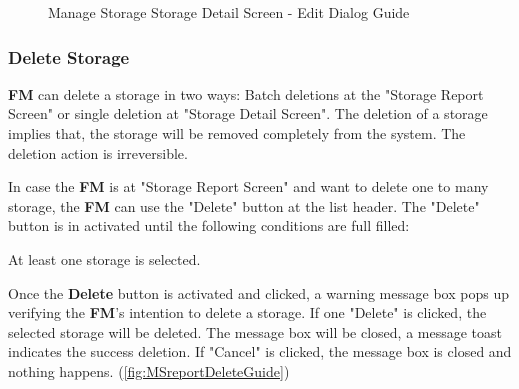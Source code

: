 \begin{figure}[H]
	\centering
    \vspace{5pt}
    \hspace{5pt}
    \caption{Manage Storage Storage Detail Screen - Edit Dialog Guide}
	\label{fig:MSDetailEditBtn}
\end{figure}

\subsubsection{Delete Storage}

\textbf{FM} can delete a storage in two ways: Batch deletions at the "Storage Report Screen" or single deletion at "Storage Detail Screen". 
The deletion of a storage implies that, the storage will be removed completely from the system. The deletion action is irreversible. 

In case the \textbf{FM} is at "Storage Report Screen" and want to delete one to many storage, the \textbf{FM} can use the "Delete" button at the list header. The "Delete" button is in activated until the following conditions are full filled:

\begin{compactenum}
    \item At least one storage is selected.
\end{compactenum}

Once the \textbf{Delete} button is activated and clicked, a warning message box pops up verifying the \textbf{FM}'s intention to delete a storage. If one "Delete" is clicked, the selected storage will be deleted. The message box will be closed, a message toast indicates the success deletion. If "Cancel" is clicked, the message box is closed and nothing happens.
(\autoref{fig:MSreportDeleteGuide})

